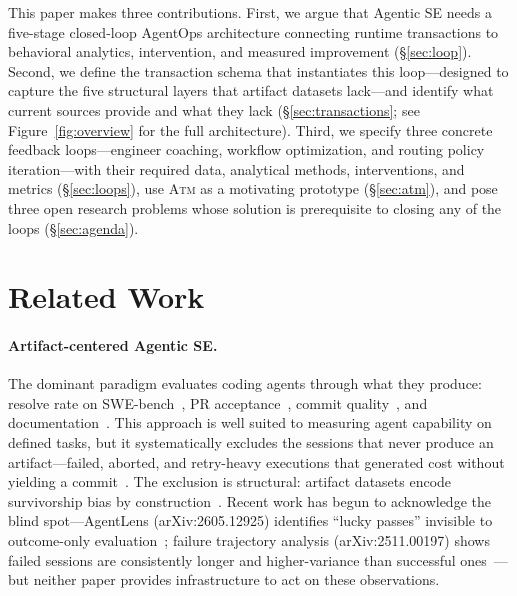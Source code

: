 \documentclass[sigconf,anonymous,review]{acmart}
\newcommand{\atm}{\textsc{Atm}\xspace}
\begin{document}
This paper makes three contributions. First, we argue that Agentic
SE needs a five-stage closed-loop AgentOps architecture connecting
runtime transactions to behavioral analytics, intervention, and
measured improvement (\S\ref{sec:loop}). Second, we define the
transaction schema that instantiates this loop---designed to
capture the five structural layers that artifact datasets lack---and
identify what current sources provide and what they lack
(\S\ref{sec:transactions}; see Figure~\ref{fig:overview} for the
full architecture). Third, we specify three concrete
feedback loops---engineer coaching, workflow optimization, and
routing policy iteration---with their required data, analytical
methods, interventions, and metrics (\S\ref{sec:loops}), use \atm
as a motivating prototype (\S\ref{sec:atm}), and pose three open
research problems whose solution is prerequisite to closing any of
the loops (\S\ref{sec:agenda}).

\section{Related Work}
\label{sec:related}

\paragraph{Artifact-centered Agentic SE.}
The dominant paradigm evaluates coding agents through what they
produce: resolve rate on SWE-bench~\cite{swebench2024, sweagent2024},
PR acceptance~\cite{nakashima2026rejected}, commit
quality~\cite{li2025se3}, and documentation~\cite{yamasaki2026docs}.
This approach is well suited to measuring agent capability on defined
tasks, but it systematically excludes the sessions that never produce
an artifact---failed, aborted, and retry-heavy executions that
generated cost without yielding a commit~\cite{ehsani2026fail,
mehtiyev2026beyond}. The exclusion is structural: artifact datasets
encode survivorship bias by construction~\cite{silentci2025,
abandonedprs2022}. Recent work has begun to acknowledge the blind
spot---AgentLens (arXiv:2605.12925) identifies ``lucky passes''
invisible to outcome-only evaluation~\cite{agentlens2026}; failure
trajectory analysis (arXiv:2511.00197) shows failed sessions are
consistently longer and higher-variance than successful
ones~\cite{majgaonkar2025trajectories}---but neither paper provides
infrastructure to act on these observations.
\end{document}
